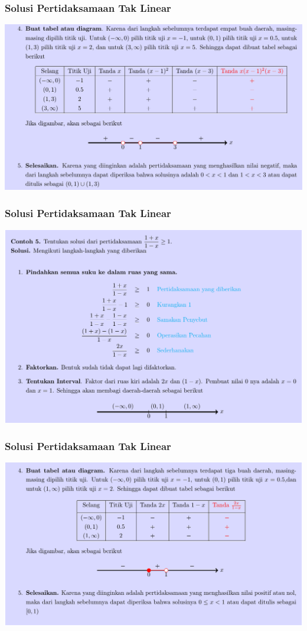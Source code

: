 \documentclass[pdflatex,compress,mathserif]{beamer}
\begin{document}
\begin{frame}
	\frametitle{Solusi Pertidaksamaan Tak Linear}
	\begin{center}
		\includegraphics[width=\linewidth]{img/img10}
	\end{center}
\end{frame}

\begin{frame}
	\frametitle{Solusi Pertidaksamaan Tak Linear}
	\begin{center}
		\includegraphics[width=\linewidth]{img/img11}
	\end{center}
\end{frame}

\begin{frame}
	\frametitle{Solusi Pertidaksamaan Tak Linear}
	\begin{center}
		\includegraphics[width=\linewidth]{img/img12}
	\end{center}
\end{frame}
\end{document}
